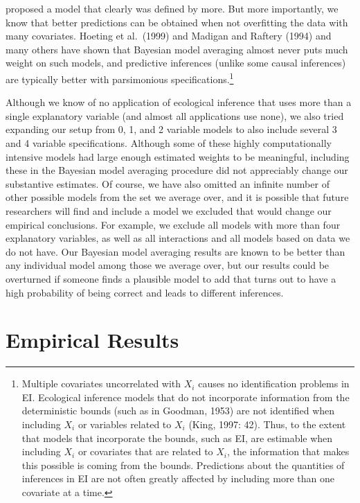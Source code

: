 \documentclass[11pt,titlepage]{article}
\begin{document}
proposed a model that clearly was defined by more.  But more
importantly, we know that better predictions can be obtained when not
overfitting the data with many covariates.  Hoeting et al.\ (1999) and
Madigan and Raftery (1994) and many others have shown that Bayesian
model averaging almost never puts much weight on such models, and
predictive inferences (unlike some causal inferences) are typically
better with parsimonious specifications.\footnote{Multiple covariates
  uncorrelated with $X_i$ causes no identification problems in EI.
  Ecological inference models that do not incorporate information from
  the deterministic bounds (such as in Goodman,
  1953\nocite{goodman53}) are not identified when including $X_i$ or
  variables related to $X_i$ (King, 1997: 42).  Thus, to the extent
  that models that incorporate the bounds, such as EI, are estimable
  when including $X_i$ or covariates that are related to $X_i$, the
  information that makes this possible is coming from the bounds.
  Predictions about the quantities of inferences in EI are not often
  greatly affected by including more than one covariate at a time.}

Although we know of no application of ecological inference that uses
more than a single explanatory variable (and almost all applications
use none), we also tried expanding our setup from 0, 1, and 2 variable
models to also include several 3 and 4 variable specifications.
Although some of these highly computationally intensive models had
large enough estimated weights to be meaningful, including these in
the Bayesian model averaging procedure did not appreciably change our
substantive estimates.  Of course, we have also omitted an infinite
number of other possible models from the set we average over, and it
is possible that future researchers will find and include a model we
excluded that would change our empirical conclusions.  For example, we
exclude all models with more than four explanatory variables, as well
as all interactions and all models based on data we do not have.  Our
Bayesian model averaging results are known to be better than any
individual model among those we average over, but our results could be
overturned if someone finds a plausible model to add that turns out to
have a high probability of being correct and leads to different
inferences.

\section{Empirical Results}
\label{s:outcome}
\end{document}
